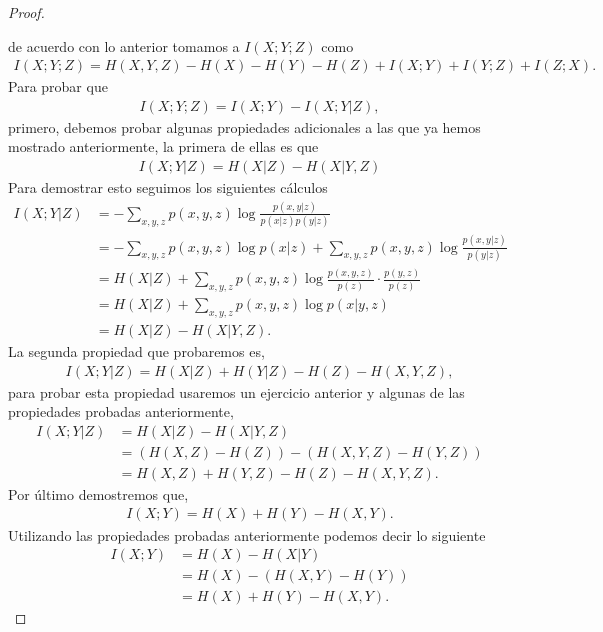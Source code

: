 \begin{enumerate}
\begin{proof}
\begin{center}
\begin{tikzpicture}[x=0.75pt,y=0.75pt,yscale=-1,xscale=1]
\end{tikzpicture}
        \end{center}
de acuerdo con lo anterior tomamos a $I(X;Y;Z)$ como
\begin{align*}
    I(X;Y;Z)=H(X,Y,Z)-H(X)-H(Y)-H(Z)+I(X;Y)+I(Y;Z)+I(Z;X).
\end{align*}
Para probar que
\begin{align*}
    I(X;Y;Z) = I(X;Y)-I(X;Y|Z),
\end{align*} 
primero, debemos probar algunas propiedades adicionales a las que ya hemos mostrado anteriormente,
la primera de ellas es que 
\begin{align}
    I(X; Y |Z) = H(X|Z)-H(X|Y,Z)
\end{align}
Para demostrar esto seguimos los siguientes cálculos
\begin{align*}
I(X; Y | Z) &= - \sum_{x,y,z} p(x, y, z) \log \frac{p(x, y | z)}{p(x | z) p(y | z)} \\
&= - \sum_{x,y,z} p(x, y, z) \log p(x | z) + \sum_{x,y,z} p(x, y, z) \log \frac{p(x, y | z)}{p(y |z)} \\
&= H(X|Z) + \sum_{x,y,z} p(x, y, z) \log \frac{p(x, y, z)}{p(z)} \cdot \frac{ p(y, z)}{p(z)} \\
&= H(X|Z) + \sum_{x,y,z} p(x, y, z) \log p(x | y, z) \\
&= H(X|Z) - H(X|Y, Z).
\end{align*}
La segunda propiedad que probaremos es,
\begin{align}
    I(X; Y |Z) = H(X|Z) + H(Y |Z) - H(Z) -H(X, Y,Z),
\end{align}
 para probar esta propiedad usaremos un ejercicio anterior y algunas de las propiedades probadas anteriormente,
 \begin{align*}
I(X; Y | Z) &= H(X | Z) - H(X | Y, Z)  \\
&= (H(X, Z) - H(Z)) - (H(X, Y, Z) - H(Y, Z)) \\
&= H(X, Z) + H(Y, Z) - H(Z) - H(X, Y, Z).
\end{align*}
Por último demostremos que,
\begin{align}
    I(X; Y ) = H(X) + H(Y ) -H(X, Y ).
\end{align}
Utilizando las propiedades probadas anteriormente podemos decir lo siguiente
\begin{align*}
I(X; Y) &= H(X) - H(X | Y) \\
&= H(X) - (H(X, Y) - H(Y))   \\
&= H(X) + H(Y) - H(X, Y).
\end{align*}


\end{proof}
\end{enumerate}
